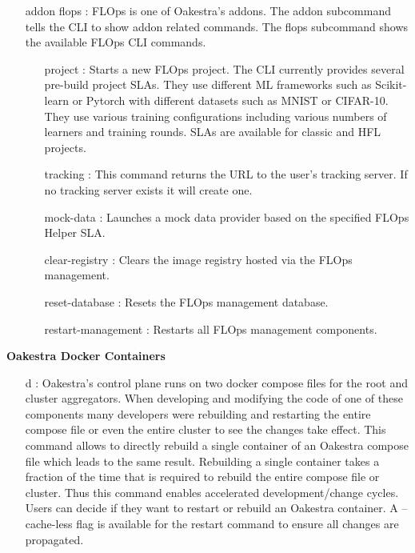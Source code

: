 \begin{itemize}
    \item [addon flops]:
        FLOps is one of Oakestra's addons.
        The addon subcommand tells the CLI to show addon related commands.
        The flops subcommand shows the available FLOps CLI commands.
        \begin{itemize}
            \item [project]:
                Starts a new FLOps project.
                The CLI currently provides several pre-build project SLAs.
                They use different ML frameworks such as Scikit-learn or Pytorch with different datasets such as MNIST or CIFAR-10.
                They use various training configurations including various numbers of learners and training rounds.
                SLAs are available for classic and HFL projects.
            \item [tracking]:
                This command returns the URL to the user's tracking server.
                If no tracking server exists it will create one.
            \item [mock-data]:
                Launches a mock data provider based on the specified FLOps Helper SLA.
            \item [clear-registry]:
                Clears the image registry hosted via the FLOps management.
            \item [reset-database]:
                Resets the FLOps management database.
            \item [restart-management]:
                Restarts all FLOps management components.
        \end{itemize}
\end{itemize}
\vspace{5mm}
\textbf{Oakestra Docker Containers}
\begin{itemize}
    \item [d]:
        Oakestra's control plane runs on two docker compose files for the root and cluster aggregators.
        When developing and modifying the code of one of these components many developers were rebuilding and restarting the entire compose file or even the entire cluster to see the changes take effect.
        This command allows to directly rebuild a single container of an Oakestra compose file which leads to the same result.
        Rebuilding a single container takes a fraction of the time that is required to rebuild the entire compose file or cluster.
        Thus this command enables accelerated development/change cycles.
        Users can decide if they want to restart or rebuild an Oakestra container.
        A --cache-less flag is available for the restart command to ensure all changes are propagated.
\end{itemize}
